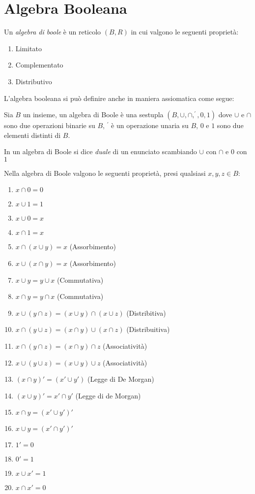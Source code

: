 \section{Algebra Booleana}
Un \emph{algebra di boole} è un reticolo $(B,R)$ in cui valgono le seguenti proprietà:
\begin{enumerate}
    \item Limitato
    \item Complementato
    \item Distributivo
\end{enumerate}

L'algebra booleana si può definire anche in maniera assiomatica come segue:
\begin{defi}
    Sia $B$ un insieme, un algebra di Boole è una sestupla $(B,\cup,\cap,^{'},0,1)$
dove $\cup$ e $\cap$ sono due operazioni binarie su $B$, $^{'}$ è un operazione unaria su $B$,
$0$ e $1$ sono due elementi distinti di $B$.
\end{defi}

\begin{defi}
    In un algebra di Boole si dice \emph{duale} di un enunciato scambiando $\cup$
    con $\cap$ e $0$ con $1$
\end{defi}

\begin{thm}Nella algebra di Boole valgono le seguenti proprietà, presi qualsiasi $x,y,z \in B$:
\end{thm}
\begin{enumerate}
    \item $x \cap 0 = 0$
    \item $x \cup 1 = 1$
    \item $x \cup 0 = x$
    \item $x \cap 1 = x $
    \item $x \cap (x \cup y) = x$ (Assorbimento)
    \item $x \cup (x \cap y) = x$ (Assorbimento)
    \item $x \cup y = y \cup x $ (Commutativa)
    \item $x \cap y = y \cap x $ (Commutativa)
    \item $x \cup (y \cap z) = (x \cup y) \cap (x \cup z) $ (Distribitiva)
    \item $x \cap (y \cup z) = (x \cap y) \cup (x \cap z) $ (Distribuitiva)
    \item $x \cap (y \cap z) = (x \cap y) \cap z$ (Associatività)
    \item $x \cup (y \cup z) = (x \cup y) \cup z$ (Associatività)
    \item $(x \cap y)' = (x' \cup y')$ (Legge di De Morgan)
    \item $(x \cup y)' = x' \cap y' $ (Legge di de Morgan)
    \item $x \cap y = (x' \cup y')'$
    \item $x \cup y = (x' \cap y')'$
    \item $1' = 0$
    \item $0' = 1$
    \item $x \cup x' = 1$
    \item $x \cap x' = 0$
\end{enumerate}

